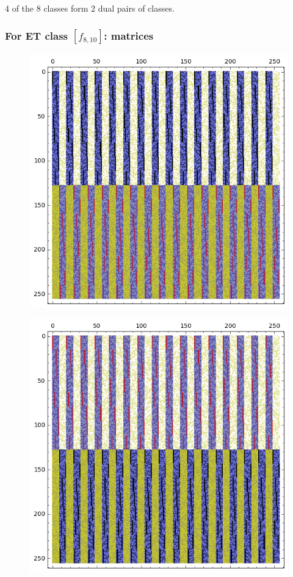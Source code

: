 \documentclass[pdf,sprung,slideColor,nocolorBG]{beamer}
\newenvironment{colortheme}[1]{
\def\ProvidesPackageRCS $##1${\relax}
\renewcommand{\ProcessOptions}{\relax}
\makeatletter

\makeatother
}{}
\begin{document}
\begin{colortheme}{jubata}
\begin{frame}
\begin{figure}
\begin{minipage}{.48\textwidth}
  \label{fig:c8_9_dual_cayley_graph_index_matrix}
\end{minipage}%
\end{figure}
4 of the 8 classes form 2 dual pairs of classes.
\end{frame}
\begin{frame}
\frametitle{For ET class $[f_{8,10}]$: matrices}
\begin{figure}
\centering
\begin{minipage}{.48\textwidth}
  \centering
  \includegraphics[width=.9\linewidth]{../matrix_plot/c8_10_bent_cayley_graph_index_matrix.png}
  \label{fig:c8_10_bent_cayley_graph_index_matrix}
\end{minipage}
\begin{minipage}{.48\textwidth}
  \centering
  \includegraphics[width=.9\linewidth]{../matrix_plot/c8_10_dual_cayley_graph_index_matrix.png}

\end{minipage}
\end{figure}
\end{frame}
\end{colortheme}
\end{document}
